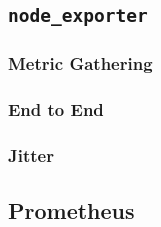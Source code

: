 \subsection{\texttt{node\_exporter}}
\subsubsection{Metric Gathering}
\subsubsection{End to End}
\subsubsection{Jitter}
\subsection{Prometheus}


